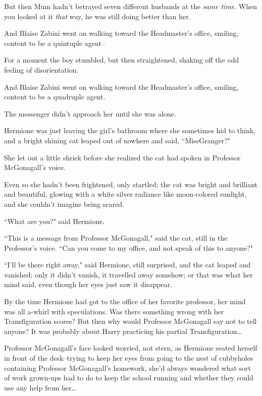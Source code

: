 But then Mum hadn't betrayed seven different husbands at the \emph{same time}. When you looked at it \emph{that} way, he was still doing better than her.

And Blaise Zabini went on walking toward the Headmaster's office, smiling, content to be a quintuple agent\---

For a moment the boy stumbled, but then straightened, shaking off the odd feeling of disorientation.

And Blaise Zabini went on walking toward the Headmaster's office, smiling, content to be a quadruple agent.


The messenger didn't approach her until she was alone.

Hermione was just leaving the girl's bathroom where she sometimes hid to think, and a bright shining cat leaped out of nowhere and said, ``Miss\?Granger?"

She let out a little shriek before she realized the cat had spoken in Professor McGonagall's voice.

Even so she hadn't been frightened, only startled; the cat was bright and brilliant and beautiful, glowing with a white silver radiance like moon-colored sunlight, and she couldn't imagine being scared.

``What are you?" said Hermione.

``This is a message from Professor McGonagall," said the cat, still in the Professor's voice. ``Can you come to my office, and not speak of this to anyone?"

``I'll be there right away," said Hermione, still surprised, and the cat leaped and vanished; only it didn't vanish, it travelled away somehow; or that was what her mind said, even though her eyes just saw it disappear.

By the time Hermione had got to the office of her favorite professor, her mind was all a-whirl with speculations. Was there something wrong with her Transfiguration scores? But then why would Professor McGonagall say not to tell anyone? It was probably about Harry practicing his partial Transfiguration{\ldots}

Professor McGonagall's face looked worried, not stern, as Hermione seated herself in front of the desk\---trying to keep her eyes from going to the nest of cubbyholes containing Professor McGonagall's homework, she'd always wondered what sort of work grown-ups had to do to keep the school running and whether they could use any help from her{\ldots}

